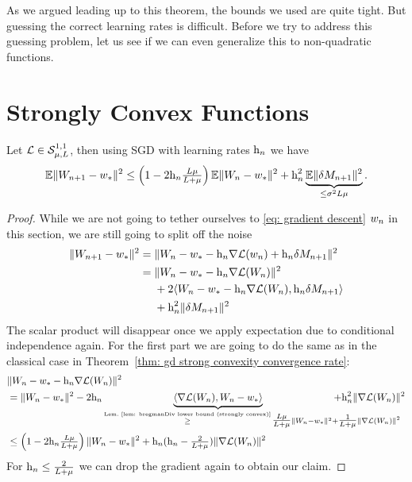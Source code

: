 As we argued leading up to this theorem, the bounds
we used are quite tight. But guessing the correct learning rates is difficult.
Before we try to address this guessing problem, let us see if we can even
generalize this to non-quadratic functions.


\section{Strongly Convex Functions}

\begin{lemma}\label{lem: SGD bound with noise}
	Let \(\mathcal{L}\in\mathcal{S}^{1,1}_{{\mu},{L}}\), then using SGD with learning
	rates \(\text{h}_n\) we have
	\begin{align*}
		\mathbb{E}\|W_{n+1} - w_*\|^2
		\le \left(1-2\text{h}_n\tfrac{L\mu}{L+\mu}\right)
		\mathbb{E}\|W_n - w_*\|^2 + \text{h}_n^2 \underbrace{\mathbb{E}\|\delta M_{n+1}\|^2}_{\le\sigma^2L\mu}.
	\end{align*}
\end{lemma}
\begin{proof}
	While we are not going to tether ourselves to \ref{eq: gradient descent} \(w_n\) in
	this section, we are still going to split off the noise
	\begin{align*}
		\|W_{n+1} - w_*\|^2
		&= \|W_n -w_* - \text{h}_n\nabla\mathcal{L}(w_n) +\text{h}_n \delta M_{n+1}\|^2\\
		&= \begin{aligned}[t]
			&\|W_n - w_* - \text{h}_n\nabla\mathcal{L}(W_n)\|^2\\
			&+ 2\langle W_n - w_* - \text{h}_n\nabla\mathcal{L}(W_n), \text{h}_n \delta M_{n+1}\rangle\\
			&+ \text{h}_n^2 \|\delta M_{n+1}\|^2
		\end{aligned}
	\end{align*}
	The scalar product will disappear once we apply expectation due to conditional
	independence again. For the first part we are going to do the same as in the
	classical case in Theorem~\ref{thm: gd strong convexity convergence rate}:
	\begin{align}
		\nonumber
		&\|\Weights_n - \minimum - \lr_n\nabla\Loss(\Weights_n)\|^2\\
		\label{eq: getting rid of the scalar product (SGD)}
		&= \|\Weights_n - \minimum\|^2
		- 2\lr_n\underbrace{\langle\nabla\Loss(\Weights_n), \Weights_n-\minimum\rangle}_{
			\xge{\text{Lem.~\ref{lem: bregmanDiv lower bound (strongly convex)}}}
			\tfrac{\ubound\lbound}{\ubound+\lbound}\|\Weights_n - \minimum\|^2
			\mathrlap{+ \tfrac{1}{\ubound+\lbound}\|\nabla\Loss(\Weights_n)\|^2}
		}
		+ \lr_n^2 \|\nabla\Loss(\Weights_n)\|^2\\
		\nonumber
		&\le \left(1-2\lr_n\tfrac{\ubound\lbound}{\ubound+\lbound}\right)
		\|\Weights_n - \minimum\|^2
		+ \lr_n(\lr_n - \tfrac{2}{\ubound+\lbound})
		\|\nabla\Loss(\Weights_n)\|^2
	\end{align}
	For \(\text{h}_n\le\tfrac{2}{L+\mu}\) we can drop the gradient again to
	obtain our claim.
\end{proof}

